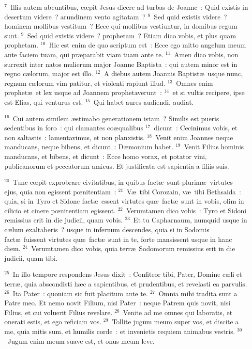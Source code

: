 ${}^{7}$~Illis autem abeuntibus, cœpit Jesus dicere ad turbas de Joanne~: Quid existis in desertum videre~? arundinem vento agitatam~?
${}^{8}$~Sed quid existis videre~? hominem mollibus vestitum~? Ecce qui mollibus vestiuntur, in domibus regum sunt.
${}^{9}$~Sed quid existis videre~? prophetam~? Etiam dico vobis, et plus quam prophetam.
${}^{10}$~Hic est enim de quo scriptum est~: Ecce ego mitto angelum meum ante faciem tuam, qui pr\ae parabit viam tuam ante te.
${}^{11}$~Amen dico vobis, non surrexit inter natos mulierum major Joanne Baptista~: qui autem minor est in regno c\ae lorum, major est illo.
${}^{12}$~A diebus autem Joannis Baptist\ae\ usque nunc, regnum c\ae lorum vim patitur, et violenti rapiunt illud.
${}^{13}$~Omnes enim prophet\ae\ et lex usque ad Joannem prophetaverunt~:
${}^{14}$~et si vultis recipere, ipse est Elias, qui venturus est.
${}^{15}$~Qui habet aures audiendi, audiat.


${}^{16}$~Cui autem similem \ae stimabo generationem istam~? Similis est pueris sedentibus in foro~: qui clamantes co\ae qualibus
${}^{17}$~dicunt~: Cecinimus vobis, et non saltastis~: lamentavimus, et non planxistis.
${}^{18}$~Venit enim Joannes neque manducans, neque bibens, et dicunt~: D\ae monium habet.
${}^{19}$~Venit Filius hominis manducans, et bibens, et dicunt~: Ecce homo vorax, et potator vini, publicanorum et peccatorum amicus. Et justificata est sapientia a filiis suis.


${}^{20}$~Tunc cœpit exprobrare civitatibus, in quibus fact\ae\ sunt plurim\ae\ virtutes ejus, quia non egissent pœnitentiam~:
${}^{21}$~V\ae\ tibi Corozain, v\ae\ tibi Bethsaida~: quia, si in Tyro et Sidone fact\ae\ essent virtutes qu\ae\ fact\ae\ sunt in vobis, olim in cilicio et cinere pœnitentiam egissent.
${}^{22}$~Verumtamen dico vobis~: Tyro et Sidoni remissius erit in die judicii, quam vobis.
${}^{23}$~Et tu Capharnaum, numquid usque in c\ae lum exaltaberis~? usque in infernum descendes, quia si in Sodomis fact\ae\ fuissent virtutes qu\ae\ fact\ae\ sunt in te, forte mansissent usque in hanc diem.
${}^{24}$~Verumtamen dico vobis, quia terr\ae\ Sodomorum remissius erit in die judicii, quam tibi.


${}^{25}$~In illo tempore respondens Jesus dixit~: Confiteor tibi, Pater, Domine c\ae li et terr\ae , quia abscondisti h\ae c a sapientibus, et prudentibus, et revelasti ea parvulis.
${}^{26}$~Ita Pater~: quoniam sic fuit placitum ante te.
${}^{27}$~Omnia mihi tradita sunt a Patre meo. Et nemo novit Filium, nisi Pater~: neque Patrem quis novit, nisi Filius, et cui voluerit Filius revelare.
${}^{28}$~Venite ad me omnes qui laboratis, et onerati estis, et ego reficiam vos.
${}^{29}$~Tollite jugum meum super vos, et discite a me, quia mitis sum, et humilis corde~: et invenietis requiem animabus vestris.
${}^{30}$~Jugum enim meum suave est, et onus meum leve.

